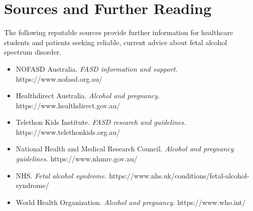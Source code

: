 \section*{Sources and Further Reading}
The following reputable sources provide further information for healthcare students and patients seeking reliable, current advice about fetal alcohol spectrum disorder.
\begin{itemize}
    \item NOFASD Australia. \textit{FASD information and support.} https://www.nofasd.org.au/
    \item Healthdirect Australia. \textit{Alcohol and pregnancy.} https://www.healthdirect.gov.au/
    \item Telethon Kids Institute. \textit{FASD research and guidelines.} https://www.telethonkids.org.au/
    \item National Health and Medical Research Council. \textit{Alcohol and pregnancy guidelines.} https://www.nhmrc.gov.au/
    \item NHS. \textit{Fetal alcohol syndrome.} https://www.nhs.uk/conditions/fetal-alcohol-syndrome/
    \item World Health Organization. \textit{Alcohol and pregnancy.} https://www.who.int/
\end{itemize}
